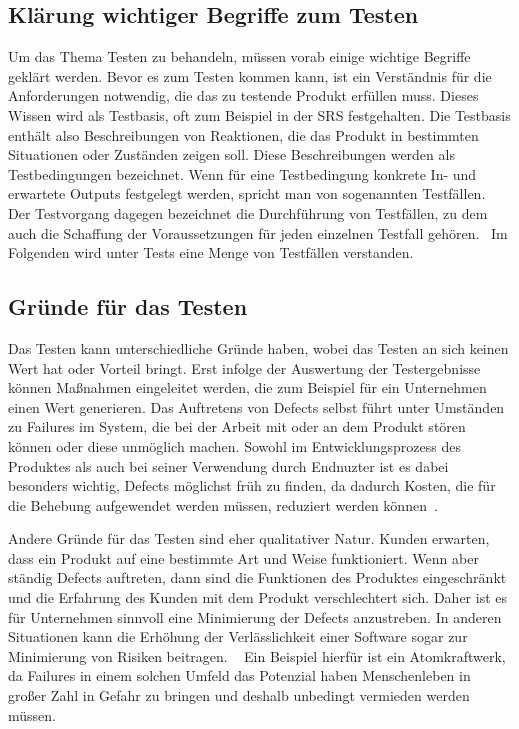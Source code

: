 \subsection{Klärung wichtiger Begriffe zum Testen}
Um das Thema Testen zu behandeln, müssen vorab einige wichtige Begriffe geklärt werden. 
Bevor es zum Testen kommen kann, ist ein Verständnis für die Anforderungen notwendig, die das zu testende Produkt erfüllen muss. Dieses Wissen wird als Testbasis, oft zum Beispiel in der \ac{SRS} festgehalten. Die Testbasis enthält also Beschreibungen von Reaktionen, die das Produkt in bestimmten Situationen oder Zuständen zeigen soll. Diese Beschreibungen werden als Testbedingungen bezeichnet. 
Wenn für eine Testbedingung konkrete In- und erwartete Outputs festgelegt werden, spricht man von sogenannten Testfällen. 
Der Testvorgang dagegen bezeichnet die Durchführung von Testfällen, zu dem auch die Schaffung der Voraussetzungen für jeden einzelnen Testfall gehören.~\cite{Hambling.2019}
Im Folgenden wird unter Tests eine Menge von Testfällen verstanden. 

\subsection{Gründe für das Testen}
Das Testen kann unterschiedliche Gründe haben, wobei das Testen an sich keinen Wert hat oder Vorteil bringt. 
Erst infolge der Auswertung der Testergebnisse können Maßnahmen eingeleitet werden, die zum Beispiel für ein Unternehmen einen Wert generieren. 
Das Auftretens von Defects selbst führt unter Umständen zu Failures im System, die bei der Arbeit mit oder an dem Produkt stören können oder diese unmöglich machen. Sowohl im Entwicklungsprozess des Produktes als auch bei seiner Verwendung durch Endnuzter ist es dabei besonders wichtig, Defects möglichst früh zu finden, da dadurch Kosten, die für die Behebung aufgewendet werden müssen, reduziert werden können~\cite{Black.2014}. 
\newline


Andere Gründe für das Testen sind eher qualitativer Natur. Kunden erwarten, dass ein Produkt auf eine bestimmte Art und Weise funktioniert. Wenn aber ständig Defects auftreten, dann sind die Funktionen des Produktes eingeschränkt und die Erfahrung des Kunden mit dem Produkt verschlechtert sich. Daher ist es für Unternehmen sinnvoll eine Minimierung der Defects anzustreben. 
In anderen Situationen kann die Erhöhung der Verlässlichkeit einer Software sogar zur Minimierung von Risiken beitragen. ~\cite{Black.2014} Ein Beispiel hierfür ist ein Atomkraftwerk, da Failures in einem solchen Umfeld das Potenzial haben Menschenleben in großer Zahl in Gefahr zu bringen und deshalb unbedingt vermieden werden müssen.


